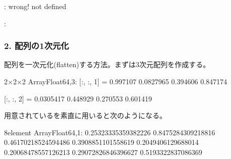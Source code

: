 \documentclass[letterpaper,10pt,english]{sphinxmanual}
\begin{document}
\begin{sphinxVerbatim}[commandchars=\\\{\}]
: wrong! not defined

:
 \PYG{p}{[}\PYG{p}{]}    \PYG{p}{[}\PYG{p}{]}
 \PYG{p}{[}\PYG{p}{]}      \PYGZbs{}
\end{sphinxVerbatim}


\subsubsection{2. 配列の1次元化}
\label{\detokenize{tips:id2}}
配列を一次元化(flatten)する方法。まずは3次元配列を作成する。

\begin{sphinxVerbatim}[commandchars=\\\{\}]
    
\end{sphinxVerbatim}

\begin{sphinxVerbatim}[commandchars=\\\{\}]
2×2×2 Array\PYGZob{}Float64,3\PYGZcb{}:
[:, :, 1] =
 0.997107  0.0827965
 0.394606  0.847174

[:, :, 2] =
 0.0305417  0.448929
 0.270553   0.601419
\end{sphinxVerbatim}

用意されているを素直に用いると次のようになる。

\begin{sphinxVerbatim}[commandchars=\\\{\}]
  
\end{sphinxVerbatim}

\begin{sphinxVerbatim}[commandchars=\\\{\}]
8\PYGZhy{}element Array\PYGZob{}Float64,1\PYGZcb{}:
 0.25323335359382226
 0.8475284309218816
 0.46170218524594486
 0.3908851101558619
 0.2049406129688014
 0.20068478557126213
 0.29072826846396627
 0.5193322837086369
\end{sphinxVerbatim}
\end{document}
